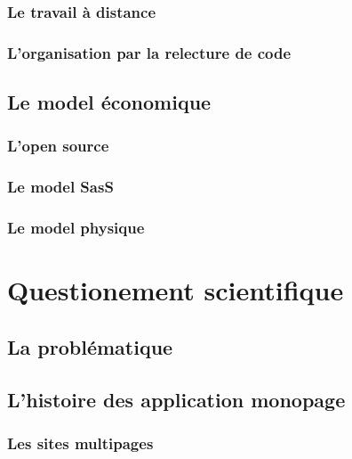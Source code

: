 \documentclass[twoside, 12pt]{report}
\begin{document}
        \section{Le travail à distance}
    		

        \section{L'organisation par la relecture de code}
    		

    \chapter{Le model économique}
    	

        \section{L'open source}
    		

        \section{Le model SasS}
    		

        \section{Le model physique}
    		

\part{Questionement scientifique}

	\chapter{La problématique}
    	
    
   	\chapter{L'histoire des application monopage}
    	
    
    	\section{Les sites multipages}
    		
        
\end{document}
